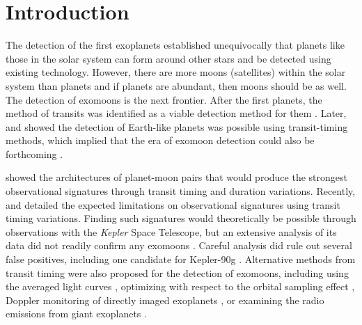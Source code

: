 \documentclass[preprint]{aastex63}
\begin{document}
\section{Introduction}

The detection of the first exoplanets \citep{Wolszczan1992,Mayor1995} established unequivocally that planets like those in the solar system can form around other stars and be detected using existing technology.  However, there are more moons (satellites) within the solar system than planets and if planets are abundant, then moons should be as well.  The detection of exomoons is the next frontier.  After the first planets, the method of transits was identified as a viable detection method for them \citep{Sartoretti1999}.  Later, \cite{Holman2005} and \cite{Agol2005} showed the detection of Earth-like planets was possible using transit-timing methods, which implied that the era of exomoon detection could also be forthcoming \citep{Cabrera2007}.  

\cite{Kipping2009a,Kipping2009b} showed the architectures of planet-moon pairs that would produce the strongest observational signatures through transit timing and duration variations.  {Recently, \cite{Kipping2020} and \cite{Kipping2021} detailed the expected limitations on observational signatures using transit timing variations.  Finding such signatures would theoretically be possible through observations with the {\it Kepler} Space Telescope,} but an extensive analysis of its data did not readily confirm any exomoons \citep{Kipping2012,Kipping2013a,Kipping2013b,Kipping2014,Kipping2015b}.  Careful analysis did rule out several false positives, including one candidate for Kepler-90g \citep{Kipping2015a}.  Alternative methods from transit timing were also proposed for the detection of exomoons, including using the averaged light curves \citep{Simon2012}, optimizing with respect to the orbital sampling effect \citep{Heller2014,Heller2016,Hippke2015}, Doppler monitoring of directly imaged exoplanets \citep{Agol2015,Vanderburg2018}, or examining the radio emissions from giant exoplanets \citep{Noyola2014,Noyola2016}.
\end{document}
